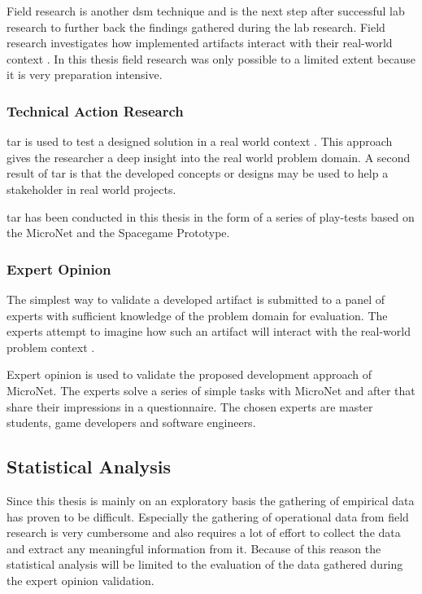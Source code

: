 Field research is another \gls{dsm} technique and is the next step after
successful lab research to further back the findings gathered during the lab
research. Field research investigates how implemented artifacts interact with
their real-world context \cite{wieringa2014design_science}. In this thesis field
research was only possible to a limited extent because it is very preparation
intensive.

\subsubsection{Technical Action Research}

\gls{tar} is used to test a designed solution in a real world context
\cite{wieringa2014design_science}. This approach gives the researcher a deep
insight into the real world problem domain. A second result of \gls{tar} is that
the developed concepts or designs may be used to help a stakeholder in real
world projects.

\gls{tar} has been conducted in this thesis in the form of a series of
play-tests based on the MicroNet and the Spacegame Prototype.

\subsubsection{Expert Opinion}

The simplest way to validate a developed artifact is submitted to a panel of
experts with sufficient knowledge of the problem domain for evaluation. The
experts attempt to imagine how such an artifact will interact with the
real-world problem context \cite{wieringa2014design_science}. 

Expert opinion is used to validate the proposed development approach of
MicroNet. The experts solve a series of simple tasks with MicroNet and after
that share their impressions in a questionnaire. The chosen experts are master
students, game developers and software engineers.

\subsection{Statistical Analysis}

Since this thesis is mainly on an exploratory basis the gathering of empirical
data has proven to be difficult. Especially the gathering of operational data from
field research is very cumbersome and also requires a lot of effort to collect
the data and extract any meaningful information from it. Because of this
reason the statistical analysis will be limited to the evaluation of the data
gathered during the expert opinion validation.






